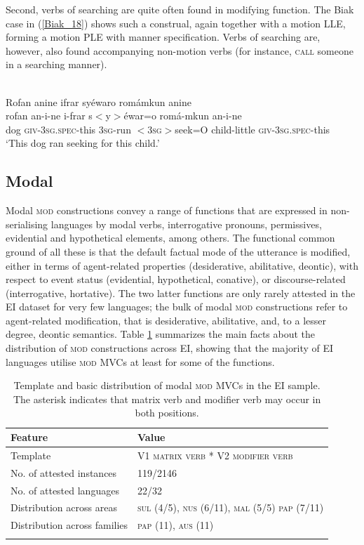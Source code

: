 Second, verbs of searching are quite often found in modifying function. The Biak case in (\ref{Biak_18}) shows such a construal, again together with a motion LLE, forming a motion PLE with manner specification. Verbs of searching are, however, also found accompanying non-motion verbs (for instance, \textsc{call} someone in a searching manner).

\ea \label{Biak_18}
\\
\glll Rofan anine ifrar syéwaro romámkun anine \\
rofan an-i-ne i-frar s$<$y$>$éwar=o romá-mkun an-i-ne \\
dog \textsc{giv}-3\textsc{sg}.\textsc{spec}-this 3\textsc{sg}-run $<$3\textsc{sg}$>$seek=O child-little \textsc{giv}-3\textsc{sg}.\textsc{spec}-this \\
\glft `This dog ran seeking for this child.'\\ 
\z

\subsection{Modal}\label{sec:modal}

Modal \textsc{mod} constructions convey a range of functions that are expressed in non-serialising languages by modal verbs, interrogative pronouns, permissives, evidential and hypothetical elements, among others. The functional common ground of all these is that the default factual mode of the utterance is modified, either in terms of agent-related properties (desiderative, abilitative, deontic),  with respect to event status (evidential, hypothetical, conative), or discourse-related (interrogative, hortative). The two latter functions are only rarely attested in the EI dataset for very few languages; the bulk of modal \textsc{mod} constructions refer to agent-related modification, that is desiderative, abilitative, and, to a lesser degree, deontic semantics. Table \ref{table:modal} summarizes the main facts about the distribution of \textsc{mod} constructions across EI, showing that the majority of EI languages utilise \textsc{mod} MVCs at least for some of the functions.

\begin{table}
\begin{tabular}{ll}
\lsptoprule
Feature&Value\tabularnewline
\midrule
Template&V1 \textsc{matrix verb} * V2 \textsc{modifier verb}\tabularnewline
No. of attested instances& 119/2146 \tabularnewline
No. of attested languages& 22/32 \tabularnewline
Distribution across areas& \textsc{sul} (4/5), \textsc{nus} (6/11), \textsc{mal} (5/5) \textsc{pap} (7/11) \tabularnewline
Distribution across families& \textsc{pap} (11), \textsc{aus} (11) \tabularnewline
\lspbottomrule
\end{tabular}
\caption[Template and basic distribution of modal \textsc{mod} MVCs]{Template and basic distribution of modal \textsc{mod} MVCs in the EI sample. The asterisk indicates that matrix verb and modifier verb may occur in both positions.}
\label{table:modal}
\end{table}

